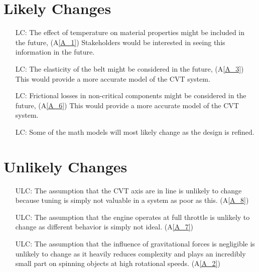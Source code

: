 \documentclass[12pt]{article}
\newcounter{lcnum} %
\newcounter{ulcnum} %
\begin{document}
\section{Likely Changes}    

\noindent \begin{itemize}

\item[LC\refstepcounter{lcnum}\thelcnum\label{LC_1}:] The effect of temperature on material properties might be included in the future, (A\ref{A_1}) Stakeholders would be interested in seeing this information in the future.
\item[LC\refstepcounter{lcnum}\thelcnum\label{LC_2}:] The elasticity of the belt might be considered in the future, (A\ref{A_3}) This would provide a more accurate model of the CVT system.
\item[LC\refstepcounter{lcnum}\thelcnum\label{LC_3}:] Frictional losses in non-critical components might be considered in the future, (A\ref{A_6}) This would provide a more accurate model of the CVT system.
\item[LC\refstepcounter{lcnum}\thelcnum\label{LC_4}:] Some of the math models will most likely change as the design is refined.

\end{itemize}

\section{Unlikely Changes}    

\begin{itemize}

  \item[ULC\refstepcounter{ulcnum}\theulcnum\label{ULC_1}:] The assumption that the CVT axis are in line is unlikely to change because tuning is simply not valuable in a system as poor as this. (A\ref{A_8})
  \item[ULC\refstepcounter{ulcnum}\theulcnum\label{ULC_2}:] The assumption that the engine operates at full throttle is unlikely to change as different behavior is simply not ideal. (A\ref{A_7})
  \item[ULC\refstepcounter{ulcnum}\theulcnum\label{ULC_3}:] The assumption that the influence of gravitational forces is negligible is unlikely to change as it heavily reduces complexity and plays an incredibly small part on spinning objects at high rotational speeds. (A\ref{A_2})
  
  \end{itemize}
\end{document}
